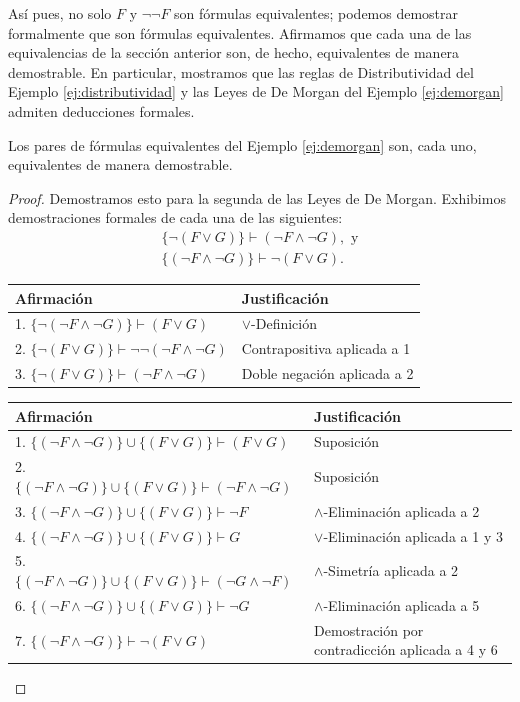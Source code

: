 \documentclass[12pt,a4paper]{book}
\makeatletter
\newenvironment{derivacion}{%
  \begingroup
  \renewcommand{\arraystretch}{1.35}
  \begin{center}
  \begin{tabular}{@{}l l@{}}
    \textbf{Afirmación} & \textbf{Justificación}\\
    \hline
}{%
  \end{tabular}
  \end{center}
  \endgroup
}
\makeatother
\begin{document}
    Así pues, no solo $F$ y $\neg\neg F$ son fórmulas equivalentes; podemos demostrar formalmente que son fórmulas
    equivalentes. Afirmamos que cada una de las equivalencias de la sección anterior son, de hecho, equivalentes de manera
    demostrable. En particular, mostramos que las reglas de Distributividad del Ejemplo \ref{ej:distributividad} y las Leyes de
    De Morgan del Ejemplo \ref{ej:demorgan} admiten deducciones formales.

    \begin{proposicion}\label{prop:demorgan-demostrable}
        Los pares de fórmulas equivalentes del Ejemplo \ref{ej:demorgan} son, cada uno, equivalentes de manera demostrable.
    \end{proposicion}
    \begin{proof}
        Demostramos esto para la segunda de las Leyes de De Morgan. Exhibimos demostraciones formales de cada una de las
        siguientes:
        \begin{gather*}
            \{\neg(F\vee G)\}\vdash(\neg F\wedge\neg G),\text{ y}\\
            \{(\neg F\wedge\neg G)\}\vdash\neg(F\vee G).
        \end{gather*}

        \begin{derivacion}
            1. $\{\neg(\neg F\wedge\neg G)\}\vdash(F\vee G)$ & $\vee$-Definición\\
            2. $\{\neg(F\vee G)\}\vdash\neg\neg(\neg F\wedge\neg G)$ & Contrapositiva aplicada a 1\\
            3. $\{\neg(F\vee G)\}\vdash(\neg F\wedge\neg G)$ & Doble negación aplicada a 2\\
        \end{derivacion}

        \vspace{0.3cm}

        \begin{derivacion}
            1. $\{(\neg F\wedge\neg G)\}\cup\{(F\vee G)\}\vdash(F\vee G)$ & Suposición\\
            2. $\{(\neg F\wedge\neg G)\}\cup\{(F\vee G)\}\vdash(\neg F\wedge\neg G)$ & Suposición\\
            3. $\{(\neg F\wedge\neg G)\}\cup\{(F\vee G)\}\vdash\neg F$ & $\wedge$-Eliminación aplicada a 2\\
            4. $\{(\neg F\wedge\neg G)\}\cup\{(F\vee G)\}\vdash G$ & $\vee$-Eliminación aplicada a 1 y 3\\
            5. $\{(\neg F\wedge\neg G)\}\cup\{(F\vee G)\}\vdash(\neg G\wedge\neg F)$ & $\wedge$-Simetría aplicada a 2\\
            6. $\{(\neg F\wedge\neg G)\}\cup\{(F\vee G)\}\vdash\neg G$ & $\wedge$-Eliminación aplicada a 5\\
            7. $\{(\neg F\wedge\neg G)\}\vdash\neg(F\vee G)$ & Demostración por contradicción aplicada a 4 y 6\\
        \end{derivacion}


\end{proof}
\end{document}
